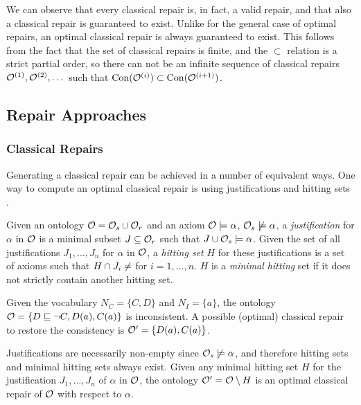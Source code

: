 We can observe that every classical repair is, in fact, a valid repair, and that also a classical repair is guaranteed to exist. Unlike for the general case of optimal repairs, an optimal classical repair is always guaranteed to exist. This follows from the fact that the set of classical repairs is finite, and the $\subset$ relation is a strict partial order, so there can not be an infinite sequence of classical repairs $\mathcal{O}^{(1)}, \mathcal{O}^{(2)}, \dots$  such that $\operatorname{Con}(\mathcal{O}^{(i)}) \subset \operatorname{Con}(\mathcal{O}^{(i + 1)})$.

\subsection{Repair Approaches} \label{repair-approaches}

\subsubsection{Classical Repairs} \label{classical-repairs}

Generating a classical repair can be achieved in a number of equivalent ways. One way to compute an optimal classical repair is using justifications and hitting sets \cite{reiter1987theory}.

\begin{definition}
  Given an ontology $\mathcal{O} = \mathcal{O}_s \cup \mathcal{O}_r$ and an axiom $\mathcal{O} \models \alpha$, $\mathcal{O}_s \not\models \alpha$, a \emph{justification} for $\alpha$ in $\mathcal{O}$ is a minimal subset $J \subseteq \mathcal{O}_r$ such that $J \cup \mathcal{O}_s \models \alpha$. Given the set of all justifications $J_1, \dots, J_n$ for $\alpha$ in $\mathcal{O}$, a \emph{hitting set} $H$ for these justifications is a set of axioms such that $H \cap J_i \not= \empty$ for $i = 1, \dots, n$. $H$ is a \emph{minimal hitting} set if it does not strictly contain another hitting set.
\end{definition}

\begin{example}
  Given the vocabulary $N_C = \{ C, D \}$ and $N_I = \{ a \}$, the ontology $\mathcal{O} = \{ D \sqsubseteq \lnot C, D(a), C(a) \}$ is inconsistent. A possible (optimal) classical repair to restore the consistency is $\mathcal{O}' = \{ D(a), C(a) \}$.
\end{example}

Justifications are necessarily non-empty since $\mathcal{O}_s \not\models \alpha$, and therefore hitting sets and minimal hitting sets always exist. Given any minimal hitting set $H$ for the justification $J_1, \dots, J_n$ of $\alpha$ in $\mathcal{O}$, the ontology $\mathcal{O}' = \mathcal{O} \setminus H$ is an optimal classical repair of $\mathcal{O}$ with respect to $\alpha$.

